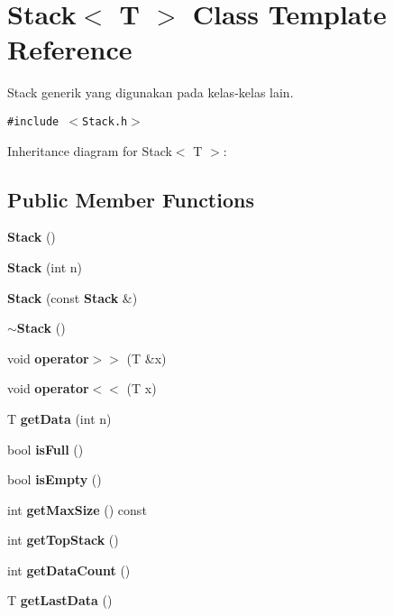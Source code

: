 \section{Stack$<$ T $>$ Class Template Reference}
\label{class_stack}
Stack generik yang digunakan pada kelas-kelas lain.  


{\tt \#include $<$Stack.h$>$}

Inheritance diagram for Stack$<$ T $>$:\subsection*{Public Member Functions}
\begin{CompactItemize}
\item 
{\bf Stack} ()\label{class_stack_a06fd74f8e8f8352189f137d21d6eea3}

\item 
{\bf Stack} (int n)\label{class_stack_5f15a233e5d0cebd897179204e54d18d}

\item 
{\bf Stack} (const {\bf Stack} \&)\label{class_stack_ea0924f40cff45619db24c049e8be620}

\item 
{\bf $\sim$Stack} ()\label{class_stack_ee3bdac48d76b2afd2786f0fccaf940d}

\item 
void {\bf operator$>$$>$} (T \&x)\label{class_stack_01ecd6c181e9d1571e7432ac3a36e63e}

\item 
void {\bf operator$<$$<$} (T x)\label{class_stack_93380200f8ba3cee005d37eed9c7f688}

\item 
T {\bf get\-Data} (int n)\label{class_stack_3ab18492a5eb1f3a4c6260572e9d5452}

\item 
bool {\bf is\-Full} ()\label{class_stack_a538452081ecd8540803c5378f715e9f}

\item 
bool {\bf is\-Empty} ()\label{class_stack_2ffe4de88739498f1c07bde62e7a2403}

\item 
int {\bf get\-Max\-Size} () const \label{class_stack_6f43e7a87bbde08ac43c4234dd38ba35}

\item 
int {\bf get\-Top\-Stack} ()\label{class_stack_94366b7ee625d56e858ab0e4737b65fc}

\item 
int {\bf get\-Data\-Count} ()\label{class_stack_8907ce4d0f2c221b5c6fa94c4587cb5c}

\item 
T {\bf get\-Last\-Data} ()\label{class_stack_56eaad5e56d8d809ba7ccd52524c1d43}

\end{CompactItemize}


